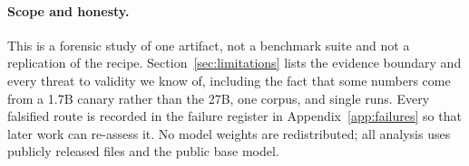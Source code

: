 \paragraph{Scope and honesty.}
This is a forensic study of one artifact, not a benchmark suite and not a
replication of the recipe. Section~\ref{sec:limitations} lists the evidence
boundary and every threat to validity we know of, including the fact that some
numbers come from a 1.7B canary rather than the 27B, one corpus, and single
runs. Every falsified route is recorded in the failure register in
Appendix~\ref{app:failures} so that later work can re-assess it. No model
weights are redistributed; all analysis uses publicly released files and the
public base model.
